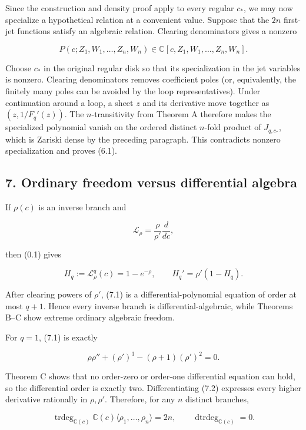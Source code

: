 Since the construction and density proof apply to every regular \(c_*\), we
may now specialize a hypothetical relation at a convenient value. Suppose
that the \(2n\) first-jet functions satisfy an algebraic
relation. Clearing denominators gives a nonzero

\[
 P(c;Z_1,W_1,\ldots,Z_n,W_n)\in
 \mathbb C[c,Z_1,W_1,\ldots,Z_n,W_n].
\]

Choose \(c_*\) in the original regular disk so that its specialization in
the jet variables is nonzero. Clearing denominators removes coefficient
poles (or, equivalently, the finitely many poles can be avoided by the loop
representatives). Under continuation around a loop, a sheet
\(z\) and its derivative move together as
\((z,1/F_q'(z))\). The \(n\)-transitivity from Theorem A therefore makes
the specialized polynomial vanish on the ordered distinct \(n\)-fold
product of \(J_{q,c_*}\), which is Zariski dense by the preceding paragraph.
This contradicts nonzero specialization and proves (6.1).

\subsection{7. Ordinary freedom versus differential algebra}

If \(\rho(c)\) is an inverse branch and

\[
 \mathcal L_\rho=\frac{\rho}{\rho'}\frac d{dc},
\]

then (0.1) gives

\[
 H_q:=\mathcal L_\rho^q(c)=1-e^{-\rho},\qquad
 H_q'=\rho'(1-H_q).
\tag{Inv-7.1}
\]

After clearing powers of \(\rho'\), (7.1) is a differential-polynomial
equation of order at most \(q+1\). Hence every inverse branch is
differential-algebraic, while Theorems B--C show extreme ordinary algebraic
freedom.

For \(q=1\), (7.1) is exactly

\[
 \rho\rho''+(\rho')^3-(\rho+1)(\rho')^2=0.
\tag{Inv-7.2}
\]

Theorem C shows that no order-zero or order-one differential equation can
hold, so the differential order is exactly two. Differentiating (7.2)
expresses every higher derivative rationally in \(\rho,\rho'\). Therefore,
for any \(n\) distinct branches,

\[
 \operatorname{trdeg}_{\mathbb C(c)}
 \mathbb C(c)\langle\rho_1,\ldots,\rho_n\rangle=2n,
 \qquad
 \operatorname{dtrdeg}_{\mathbb C(c)}=0.
\tag{Inv-7.3}
\]

